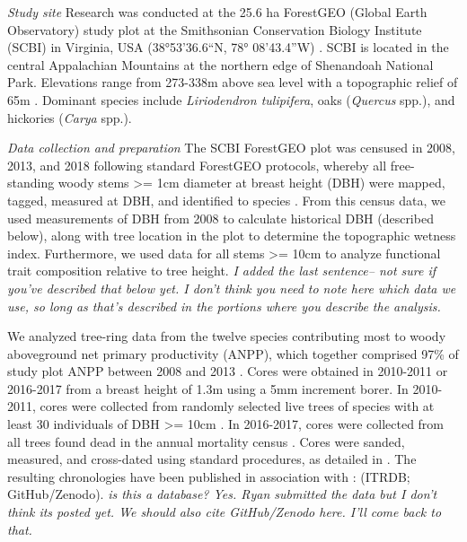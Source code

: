 \documentclass[]{article}
\begin{document}
\emph{Study site} Research was conducted at the 25.6 ha ForestGEO
(Global Earth Observatory) study plot at the Smithsonian Conservation
Biology Institute (SCBI) in Virginia, USA (38°53'36.6``N, 78°
08'43.4''W) \citep{andersonteixeira_ctfs-forestgeo:_2015}. SCBI is
located in the central Appalachian Mountains at the northern edge of
Shenandoah National Park. Elevations range from 273-338m above sea level
\citep{gonzalezakre_patterns_2016} with a topographic relief of 65m
\citep{bourg_initial_2013}. Dominant species include \emph{Liriodendron
tulipifera}, oaks (\emph{Quercus} spp.), and hickories (\emph{Carya}
spp.).

\emph{Data collection and preparation} The SCBI ForestGEO plot was
censused in 2008, 2013, and 2018 following standard ForestGEO protocols,
whereby all free-standing woody stems \textgreater{}= 1cm diameter at
breast height (DBH) were mapped, tagged, measured at DBH, and identified
to species \citep{condit_tropical_1998}. From this census data, we used
measurements of DBH from 2008 to calculate historical DBH (described
below), along with tree location in the plot to determine the
topographic wetness index. Furthermore, we used data for all stems
\textgreater{}= 10cm to analyze functional trait composition relative to
tree height. \emph{I added the last sentence-- not sure if you've
described that below yet. I don't think you need to note here which data
we use, so long as that's described in the portions where you describe
the analysis.}

We analyzed tree-ring data from the twelve species contributing most to
woody aboveground net primary productivity (ANPP), which together
comprised 97\% of study plot ANPP between 2008 and 2013
\citep{helcoski_growing_2019}. Cores were obtained in 2010-2011 or
2016-2017 from a breast height of 1.3m using a 5mm increment borer. In
2010-2011, cores were collected from randomly selected live trees of
species with at least 30 individuals of DBH \textgreater{}= 10cm
\citep{bourg_initial_2013}. In 2016-2017, cores were collected from all
trees found dead in the annual mortality census
\citep{gonzalezakre_patterns_2016}. Cores were sanded, measured, and
cross-dated using standard procedures, as detailed in
\citep{helcoski_growing_2019}. The resulting chronologies have been
published in association with \citet{helcoski_growing_2019}: (ITRDB;
GitHub/Zenodo). \emph{is this a database? Yes. Ryan submitted the data
but I don't think its posted yet. We should also cite GitHub/Zenodo
here. I'll come back to that. }
\end{document}
